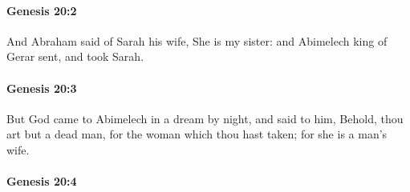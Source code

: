 
		\paragraph{Genesis 20:2} %
			\label{GENESIS-20-2}

			And Abraham said of Sarah his wife, She is my sister: and Abimelech king of Gerar sent, and took Sarah.


		\paragraph{Genesis 20:3} %
			\label{GENESIS-20-3}

			But God came to Abimelech in a dream by night, and said to him, Behold, thou art but a dead man, for the woman which thou hast taken; for she is a man's wife.


		\paragraph{Genesis 20:4} %
			\label{GENESIS-20-4}

